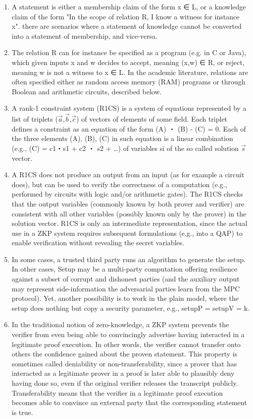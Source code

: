 \documentclass[11pt]{article}
\begin{document}
\begin{enumerate}
\item A statement is either a membership claim of the form x ∈ L, or a knowledge claim of the form "In the scope of relation R, I know a witness for instance x". there are scenarios where a statement of knowledge cannot be converted into a statement of membership, and vice-versa.

\item The relation R can for instance be specified as a program (e.g. in C or Java), which given inputs x and w decides to accept, meaning (x,w) ∈ R, or reject, meaning w is not a witness to x ∈ L. In the academic literature, relations are often specified either as random access memory (RAM) programs or through Boolean and arithmetic circuits, described below.

\item A rank-1 constraint system (R1CS) is a system of equations represented by a list of triplets (\(\vec{a}\),\(\vec{b}\),\(\vec{c}\)) of vectors of elements of some field. Each triplet defines a constraint as an equation of the form (A) ・ (B) - (C) = 0. Each of the three elements (A), (B), (C) in such equation is a linear combination (e.g., (C) = c1・s1 + c2 ・ s2 + \ldots{}) of variables si of the so called solution \(\vec{s}\) vector.

\item A R1CS does not produce an output from an input (as for example a circuit does), but can be used to verify the correctness of a computation (e.g., performed by circuits with logic and/or arithmetic gates). The R1CS checks that the output variables (commonly known by both prover and verifier) are consistent with all other variables (possibly known only by the prover) in the solution vector. R1CS is only an intermediate representation, since the actual use in a ZKP system requires subsequent formulations (e.g., into a QAP) to enable verification without revealing the secret variables.

\item In some cases, a trusted third party runs an algorithm to generate the setup. In other cases, Setup may be a multi-party computation offering resilience against a subset of corrupt and dishonest parties (and the auxiliary output may represent side-information the adversarial parties learn from the MPC protocol). Yet, another possibility is to work in the plain model, where the setup does nothing but copy a security parameter, e.g., setupP = setupV = k.

\item In the traditional notion of zero-knowledge, a ZKP system prevents the verifier from even being able to convincingly advertise having interacted in a legitimate proof execution. In other words, the verifier cannot transfer onto others the confidence gained about the proven statement. This property is sometimes called deniability or non-transferability, since a prover that has interacted as a legitimate prover in a proof is later able to plausibly deny having done so, even if the original verifier releases the transcript publicly. Transferability means that the verifier in a legitimate proof execution becomes able to convince an external party that the corresponding statement is true.


\end{enumerate}
\end{document}
